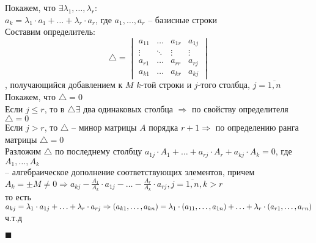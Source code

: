 \documentclass[a4paper,12pt]{article}
\newcommand*{\hm}[1]{#1\nobreak\discretionary{}
{\hbox{$\mathsurround=0pt #1$}}{}}
\begin{document}
    Покажем, что $\exists \lambda_1, \ldots, \lambda_r$:\\
    $a_k=\lambda_1\cdot a_1+\ldots+\lambda_r\cdot a_r$, где $a_1, \ldots, a_r$ -- базисные строки\\
    Составим определитель:
    \[
        \triangle=\begin{vmatrix}
                      a_{11} & \ldots & a_{1r} & a_{1j} \\
                      \vdots & \ddots & \vdots & \vdots \\
                      a_{r1} & \ldots & a_{rr} & a_{rj} \\
                      a_{k1} & \ldots & a_{kr} & a_{kj}
        \end{vmatrix}
    \]
    , получающийся добавлением к $M$ $k$-той строки и $j$-того столбца, $j=\overline{1, n}$\\
    Покажем, что $\triangle=0$\\
    Если $j\leq r$, то в $\triangle \exists$ два одинаковых столбца $\Rightarrow$ по свойству определителя $\triangle=0$\\
    Если $j>r$, то $\triangle$ -- минор матрицы $A$ порядка $r+1\Rightarrow$ по определению ранга матрицы $\triangle=0$\\
    Разложим $\triangle$ по последнему столбцу $a_{1j}\cdot A_1+\ldots+a_{rj}\cdot A_r+a_{kj}\cdot A_k=0$, где $A_1, \ldots, A_k$ \\-- алгебраическое дополнение соответствующих элементов, причем $A_k=\pm M\ne 0\Rightarrow a_{kj}-\frac{A_1}{A_k}\cdot a_{1j}-\ldots-\frac{A_r}{A_k}\cdot a_{rj}, j=\overline{1, n}, k>r$\\
    то есть $a_{kj}=\lambda_1\cdot a_{1j}+\ldots+\lambda_r\cdot a_{rj}\Rightarrow(a_{k1}, \ldots, a_{kn})=\lambda_1\cdot(a_{11}, \ldots, a_{1n})\hm{+}\ldots+\lambda_r\cdot(a_{r1}, \ldots, a_{rn})$\\
    ч.т.д
    \begin{flushright}
        $\blacksquare$
    \end{flushright}
\end{document}
